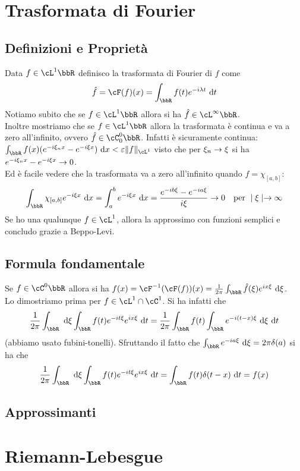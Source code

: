 \documentclass[a4paper,NoNotes,GeneralMath]{stdmdoc}
\newcommand{\fractopie}{\frac{1}{2\pi}}
\begin{document}
	\section*{Trasformata di Fourier}
	\subsection*{Definizioni e Proprietà}
	Data $f \in \cL^1 \bbR$ definisco la trasformata di Fourier di $f$ come
	$$ \hat{f} = \cF(f)(x) = \int_\bbR f(t) e^{-i\lambda t} \de t $$
	Notiamo subito che se $f \in \cL^1 \bbR$ allora si ha $\hat{f} \in \cL^\infty \bbR$. \\
	Inoltre mostriamo che se $f \in \cL^1 \bbR$ allora la trasformata è continua e va a zero all'infinito, ovvero $\hat{f} \in \cC^0_0 \bbR$. Infatti è sicuramente continua: $ \int_\bbR f(x) ( e^{-i\xi_n x} - e^{-i\xi x} ) \de x < \varepsilon \norm{f}_{\cL^1} $ visto che per $\xi_n \rightarrow \xi$ si ha $e^{-i\xi_n x} - e^{-i\xi x} \rightarrow 0$. \\
	Ed è facile vedere che la trasformata va a zero all'infinito quando $f = \chi_{[a,b]}$:
	$$ \int_\bbR \chi_{[a,b]} e^{-i\xi x} \de x = \int_a^b e^{-i\xi x} \de x = \frac{e^{-ib\xi} - e^{-ia\xi}}{i\xi} \rar 0 \quad \text{per } \abs{\xi} \rar \infty $$
	Se ho una qualunque $f \in \cL^1$, allora la approssimo con funzioni semplici e concludo grazie a Beppo-Levi.
	
	\subsection*{Formula fondamentale}
	Se $f \in \cC^0 \bbR$ allora si ha $f(x) = \cF^{-1}(\cF(f))(x) = \fractopie \int_\bbR \hat{f}(\xi) e^{ix\xi} \de\xi$. \\
	Lo dimostriamo prima per $f \in \cL^1 \cap \cC^1$. Si ha infatti che
	$$ \fractopie \int_\bbR \de\xi \int_\bbR f(t) e^{-it\xi} e^{ix\xi} \de t = \fractopie \int_\bbR f(t) \int_\bbR e^{-i(t-x)\xi} \de\xi \de t $$
	(abbiamo usato fubini-tonelli). Sfruttando il fatto che $\int_\bbR e^{-ia\xi} \de\xi = 2\pi \delta(a)$ si ha che
	$$ \fractopie \int_\bbR \de\xi \int_\bbR f(t) e^{-it\xi} e^{ix\xi} \de t = \int_\bbR f(t) \delta(t-x) \de t = f(x) $$
	
	\subsection*{Approssimanti}
	
	\section*{Riemann-Lebesgue}
\end{document}
